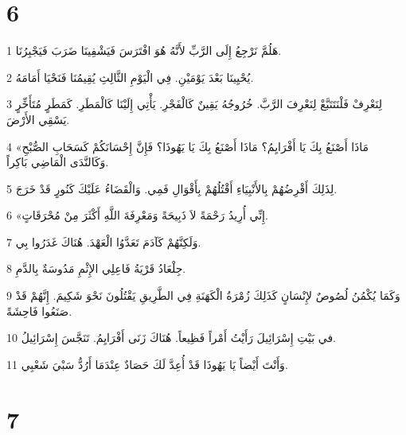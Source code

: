 \chapter{6}

\par 1 هَلُمَّ نَرْجِعُ إِلَى الرَّبِّ لأَنَّهُ هُوَ افْتَرَسَ فَيَشْفِينَا ضَرَبَ فَيَجْبِرُنَا.
\par 2 يُحْيِينَا بَعْدَ يَوْمَيْنِ. فِي الْيَوْمِ الثَّالِثِ يُقِيمُنَا فَنَحْيَا أَمَامَهُ.
\par 3 لِنَعْرِفْ فَلْنَتَتَبَّعْ لِنَعْرِفَ الرَّبَّ. خُرُوجُهُ يَقِينٌ كَالْفَجْرِ. يَأْتِي إِلَيْنَا كَالْمَطَرِ. كَمَطَرٍ مُتَأَخِّرٍ يَسْقِي الأَرْضَ.
\par 4 «مَاذَا أَصْنَعُ بِكَ يَا أَفْرَايِمُ؟ مَاذَا أَصْنَعُ بِكَ يَا يَهُوذَا؟ فَإِنَّ إِحْسَانَكُمْ كَسَحَابِ الصُّبْحِ وَكَالنَّدَى الْمَاضِي بَاكِراً.
\par 5 لِذَلِكَ أَقْرِضُهُمْ بِالأَنْبِيَاءِ أَقْتُلُهُمْ بِأَقْوَالِ فَمِي. وَالْقَضَاءُ عَلَيْكَ كَنُورٍ قَدْ خَرَجَ.
\par 6 «إِنِّي أُرِيدُ رَحْمَةً لاَ ذَبِيحَةً وَمَعْرِفَةَ اللَّهِ أَكْثَرَ مِنْ مُحْرَقَاتٍ.
\par 7 وَلَكِنَّهُمْ كَآدَمَ تَعَدَّوُا الْعَهْدَ. هُنَاكَ غَدَرُوا بِي.
\par 8 جِلْعَادُ قَرْيَةُ فَاعِلِي الإِثْمِ مَدُوسَةٌ بِالدَّمِ.
\par 9 وَكَمَا يُكْمُنُ لُصُوصٌ لإِنْسَانٍ كَذَلِكَ زُمْرَةُ الْكَهَنَةِ فِي الطَّرِيقِ يَقْتُلُونَ نَحْوَ شَكِيمَ. إِنَّهُمْ قَدْ صَنَعُوا فَاحِشَةً.
\par 10 في بَيْتِ إِسْرَائِيلَ رَأَيْتُ أَمْراً فَظِيعاً. هُنَاكَ زَنَى أَفْرَايِمُ. تَنَجَّسَ إِسْرَائِيلُ.
\par 11 وَأَنْتَ أَيْضاً يَا يَهُوذَا قَدْ أُعِدَّ لَكَ حَصَادٌ عِنْدَمَا أَرُدُّ سَبْيَ شَعْبِي.

\chapter{7}


